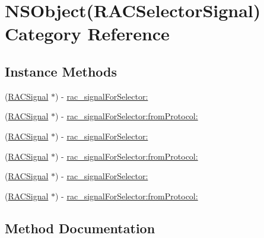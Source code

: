 \hypertarget{category_n_s_object_07_r_a_c_selector_signal_08}{}\section{N\+S\+Object(R\+A\+C\+Selector\+Signal) Category Reference}
\label{category_n_s_object_07_r_a_c_selector_signal_08}
\subsection*{Instance Methods}
\begin{DoxyCompactItemize}
\item 
(\mbox{\hyperlink{interface_r_a_c_signal}{R\+A\+C\+Signal}} $\ast$) -\/ \mbox{\hyperlink{category_n_s_object_07_r_a_c_selector_signal_08_ab045e731d5071c2dc76a950c9be2e5fa}{rac\+\_\+signal\+For\+Selector\+:}}
\item 
(\mbox{\hyperlink{interface_r_a_c_signal}{R\+A\+C\+Signal}} $\ast$) -\/ \mbox{\hyperlink{category_n_s_object_07_r_a_c_selector_signal_08_ac1bb0fd410309fd037ae60f81fc8d55b}{rac\+\_\+signal\+For\+Selector\+:from\+Protocol\+:}}
\item 
(\mbox{\hyperlink{interface_r_a_c_signal}{R\+A\+C\+Signal}} $\ast$) -\/ \mbox{\hyperlink{category_n_s_object_07_r_a_c_selector_signal_08_ab045e731d5071c2dc76a950c9be2e5fa}{rac\+\_\+signal\+For\+Selector\+:}}
\item 
(\mbox{\hyperlink{interface_r_a_c_signal}{R\+A\+C\+Signal}} $\ast$) -\/ \mbox{\hyperlink{category_n_s_object_07_r_a_c_selector_signal_08_ac1bb0fd410309fd037ae60f81fc8d55b}{rac\+\_\+signal\+For\+Selector\+:from\+Protocol\+:}}
\item 
(\mbox{\hyperlink{interface_r_a_c_signal}{R\+A\+C\+Signal}} $\ast$) -\/ \mbox{\hyperlink{category_n_s_object_07_r_a_c_selector_signal_08_ab045e731d5071c2dc76a950c9be2e5fa}{rac\+\_\+signal\+For\+Selector\+:}}
\item 
(\mbox{\hyperlink{interface_r_a_c_signal}{R\+A\+C\+Signal}} $\ast$) -\/ \mbox{\hyperlink{category_n_s_object_07_r_a_c_selector_signal_08_ac1bb0fd410309fd037ae60f81fc8d55b}{rac\+\_\+signal\+For\+Selector\+:from\+Protocol\+:}}
\end{DoxyCompactItemize}


\subsection{Method Documentation}
\mbox{\label{category_n_s_object_07_r_a_c_selector_signal_08_ab045e731d5071c2dc76a950c9be2e5fa}} 

